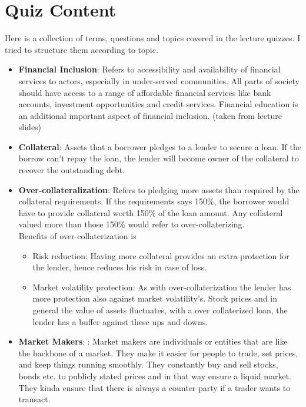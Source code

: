 \documentclass{article}
\begin{document}
\section{Quiz Content}
Here is a collection of terms, questions and topics covered in the lecture quizzes. I tried to structure them according to topic.
\begin{itemize}
    
    \item \textbf{Financial Inclusion}: Refers to accessibility and availability of financial services to actors, especially in under-served communities. All parts of society should have access to a range of affordable financial services like bank accounts, investment opportunities and credit services. Financial education is an additional important aspect of financial inclusion. 
    (taken from lecture slides)
    
    \item \textbf{Collateral}:  Assets that a borrower pledges to a lender to secure a loan.
    If the borrow can't repay the loan, the lender will become owner of the collateral to recover the outstanding debt.
    
    
    \item \textbf{Over-collateralization}: Refers to pledging more assets than required by the collateral requirements. If the requirements says 150\%, the borrower would have to provide collateral worth 150\% of the loan amount. Any collateral valued more than those 150\% would refer to over-collaterizing.\\
    Benefits of over-collaterization is
    
    \begin{itemize}
     \item {Risk reduction}:
        Having more collateral provides an extra protection for the lender, hence reduces his risk in case of loss.  
    
    \item {Market volatility protection}:
    As with over-collaterization the lender has more protection also against market volatility's. Stock prices and in general the value of assets fluctuates, with a over collaterized loan, the lender has a buffer against these ups and downs.
     \end{itemize}

     
     \item \textbf{Market Makers}: :
        Market makers are individuals or entities that are like the backbone of a market. They make it easier for people to trade, set prices, and keep things running smoothly. They constantly buy and sell stocks, bonds etc. to publicly stated prices and in that way ensure a liquid market. They kinda ensure that there is always a counter party if a trader wants to transact.
    

\end{itemize}
\end{document}
